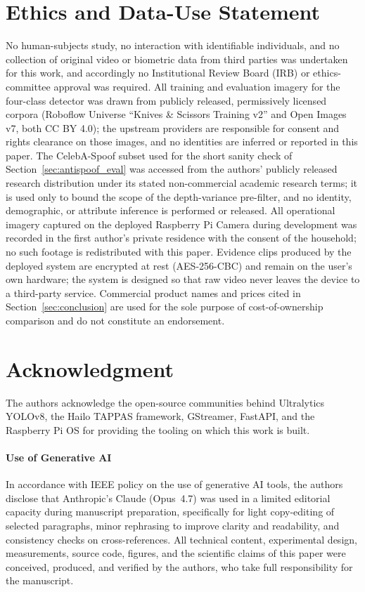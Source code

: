 \documentclass{ieeeaccess}
\begin{document}
\section*{Ethics and Data-Use Statement}
\label{sec:ethics}
No human-subjects study, no interaction with identifiable individuals, and no collection of original video or biometric data from third parties was undertaken for this work, and accordingly no Institutional Review Board (IRB) or ethics-committee approval was required. All training and evaluation imagery for the four-class detector was drawn from publicly released, permissively licensed corpora (Roboflow Universe ``Knives \& Scissors Training v2'' and Open Images v7, both CC BY 4.0); the upstream providers are responsible for consent and rights clearance on those images, and no identities are inferred or reported in this paper. The CelebA-Spoof subset used for the short sanity check of Section~\ref{sec:antispoof_eval} was accessed from the authors' publicly released research distribution under its stated non-commercial academic research terms; it is used only to bound the scope of the depth-variance pre-filter, and no identity, demographic, or attribute inference is performed or released. All operational imagery captured on the deployed Raspberry Pi Camera during development was recorded in the first author's private residence with the consent of the household; no such footage is redistributed with this paper. Evidence clips produced by the deployed system are encrypted at rest (AES-256-CBC) and remain on the user's own hardware; the system is designed so that raw video never leaves the device to a third-party service. Commercial product names and prices cited in Section~\ref{sec:conclusion} are used for the sole purpose of cost-of-ownership comparison and do not constitute an endorsement.

\section*{Acknowledgment}
The authors acknowledge the open-source communities behind Ultralytics YOLOv8, the Hailo TAPPAS framework, GStreamer, FastAPI, and the Raspberry Pi OS for providing the tooling on which this work is built.

\paragraph*{Use of Generative AI}
In accordance with IEEE policy on the use of generative AI tools, the authors disclose that Anthropic's Claude (Opus~4.7) was used in a limited editorial capacity during manuscript preparation, specifically for light copy-editing of selected paragraphs, minor rephrasing to improve clarity and readability, and consistency checks on cross-references. All technical content, experimental design, measurements, source code, figures, and the scientific claims of this paper were conceived, produced, and verified by the authors, who take full responsibility for the manuscript.
\end{document}
